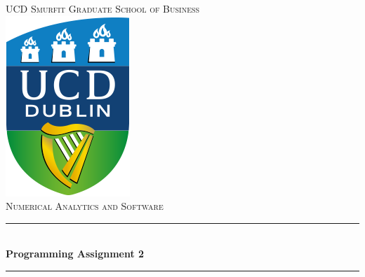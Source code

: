 \documentclass[paper=a4, fontsize=10pt]{article} %
\begin{document}
\begin{titlepage}

\newcommand{\HRule}{\rule{\linewidth}{0.5mm}} %

\center %
 

\textsc{\LARGE UCD Smurfit Graduate School of Business}\\[1.5cm] %
\includegraphics[scale = 0.6]{images/logo.png} \\ [1cm]
\textsc{\Large Numerical Analytics and Software}\\[0.5cm] %


\HRule \\[0.4cm]
{ \LARGE \bfseries Programming Assignment 2}\\[0.4cm] %
\HRule \\[1.5cm]
 


\end{titlepage}
\end{document}
